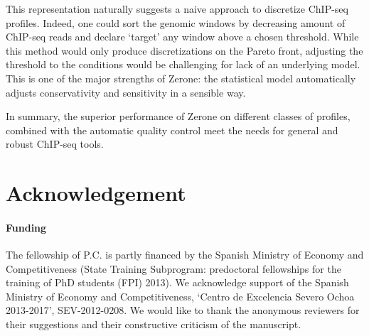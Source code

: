 \documentclass{bioinfo}
\begin{document}
This representation naturally suggests a naive approach to discretize
ChIP-seq profiles. Indeed, one could sort the genomic windows by
decreasing amount of ChIP-seq reads and declare `target' any window
above a chosen threshold. While this method would only produce
discretizations on the Pareto front, adjusting the threshold to the
conditions would be challenging for lack of an underlying model.
This is one of the major strengths of Zerone: the statistical model
automatically adjusts conservativity and sensitivity in a sensible way.

In summary, the superior performance of Zerone on different classes
of profiles, combined with the automatic quality control meet the
needs for general and robust ChIP-seq tools.

\section*{Acknowledgement}
\paragraph{Funding\textcolon}
The fellowship of P.C. is partly financed by the Spanish Ministry
of Economy and Competitiveness (State Training Subprogram: predoctoral
fellowships for the training of PhD students (FPI) 2013).
We acknowledge support of the Spanish Ministry of Economy and
Competitiveness, `Centro de Excelencia Severo Ochoa 2013-2017',
SEV-2012-0208. We would like to thank the anonymous reviewers
for their suggestions and their constructive criticism of the
manuscript.



\end{document}
